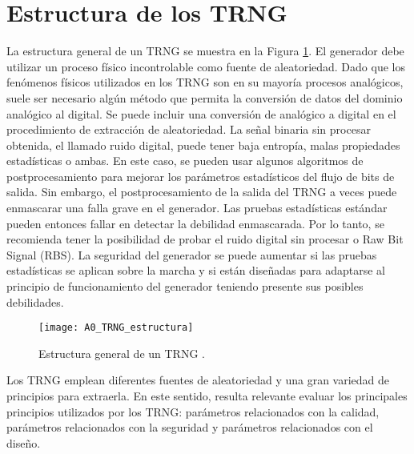 	\section{Estructura de los TRNG}	

        La estructura general de un TRNG se muestra en la Figura \ref{fig:A1_TRNG_estructura}. El generador debe utilizar un proceso físico incontrolable como fuente de aleatoriedad. Dado que los fenómenos físicos utilizados en los TRNG son en su mayoría procesos analógicos, suele ser necesario algún método que permita la conversión de datos del dominio analógico al digital. Se puede incluir una conversión de analógico a digital en el procedimiento de extracción de aleatoriedad. La señal binaria sin procesar obtenida, el llamado ruido digital, puede tener baja entropía, malas propiedades estadísticas o ambas. En este caso, se pueden usar algunos algoritmos de postprocesamiento para mejorar los parámetros estadísticos del flujo de bits de salida. Sin embargo, el postprocesamiento de la salida del TRNG a veces puede enmascarar una falla grave en el generador. Las pruebas estadísticas estándar pueden entonces fallar en detectar la debilidad enmascarada. Por lo tanto, se recomienda tener la posibilidad de probar el ruido digital sin procesar o Raw Bit Signal (RBS). La seguridad del generador se puede aumentar si las pruebas estadísticas se aplican sobre la marcha y si están diseñadas para adaptarse al principio de funcionamiento del generador teniendo presente sus posibles debilidades. \cite{Badrignans2011}
			
        \begin{figure}[hbtp]
            \caption{Estructura general de un TRNG \cite{Badrignans2011}.}
            \centering
            \texttt{[image: A0\_TRNG\_estructura]}
            \label{fig:A1_TRNG_estructura}
        \end{figure}
	
        Los TRNG emplean diferentes fuentes de aleatoriedad y una gran variedad de principios para extraerla. En este sentido, resulta relevante evaluar los principales principios utilizados por los TRNG: parámetros relacionados con la calidad, parámetros relacionados con la seguridad y parámetros relacionados con el diseño.

